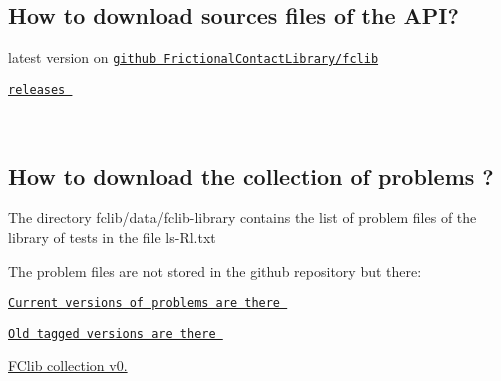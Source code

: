 \hypertarget{download_howtosources}{}\subsection{How to download sources files of the A\+P\+I?}\label{download_howtosources}

\begin{DoxyItemize}
\item latest version on \href{https://github.com/FrictionalContactLibrary/fclib}{\tt github Frictional\+Contact\+Library/fclib} 
\item \href{https://github.com/FrictionalContactLibrary/fclib/releases}{\tt releases } 
\end{DoxyItemize}

~\newline
 \hypertarget{download_howtolibrary}{}\subsection{How to download the collection of problems ?}\label{download_howtolibrary}

\begin{DoxyItemize}
\item The directory fclib/data/fclib-\/library contains the list of problem files of the library of tests in the file ls-\/\+Rl.\+txt 


\item The problem files are not stored in the github repository but there\+:  
\begin{DoxyItemize}
\item \href{http://faf.gforge.inria.fr/fclib-library/}{\tt Current versions of problems are there }  
\item \href{http://fclib.gforge.inria.fr/resources/}{\tt Old tagged versions are there } 
\end{DoxyItemize}
\item \hyperlink{problems_0_2}{F\+Clib collection v0.}  
\end{DoxyItemize}~\newline
 